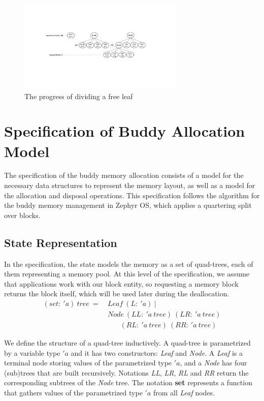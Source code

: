 \begin{figure}[htbp]
	\centering
	\includegraphics[width=0.7\textwidth]{fig1.pdf}
	\caption{The progress of dividing a free leaf}
	\label{fig:splitleaf}
\end{figure}

\section{Specification of Buddy Allocation Model}\label{sec:spec}
The specification of the buddy memory allocation consists of a model for the necessary data structures to represent the memory layout, as well as a model for the allocation and disposal operations. This specification follows the algorithm for the buddy memory management in Zephyr OS, which applies a quartering split over blocks.

\subsection{State Representation}\label{statedes}
In the specification, the state models the memory as a set of quad-trees, each of them representing a memory pool. At this level of the specification, we assume that applications work with our block entity, so requesting a memory block returns the block itself, which will be used later during the deallocation.
\begin{align*}
(set:\ 'a)\ tree\ =\ &Leaf\ (L:\ 'a)\ | \\
&Node\ (LL:\ 'a\ tree)\ (LR:\ 'a\ tree)\\
&\ \ \ \ \ \ \ \ (RL:\ 'a\ tree)\ (RR:\ 'a\ tree)
\end{align*}

We define the structure of a quad-tree inductively. A quad-tree is parametrized by a variable type $'a$ and it has two constructors: \emph{Leaf} and \emph{Node}. A \emph{Leaf} is a terminal node storing values of the parametrized type $'a$, and a \emph{Node} has four (sub)trees that are built recursively. Notations \emph{LL}, \emph{LR}, \emph{RL} and \emph{RR} return the corresponding subtrees of the \emph{Node} tree. The notation \textbf{set} represents a function that gathers values of the parametrized type $'a$ from all \emph{Leaf} nodes.

